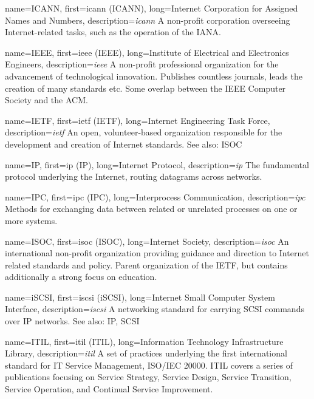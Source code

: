 {
	name={ICANN},
	first={\acrlong{icann} (ICANN)},
	long={Internet Corporation for Assigned Names and Numbers},
	description={{\em \acrlong{icann}} A
non-profit corporation overseeing Internet-related tasks, such as the
operation of the IANA.}
}

{
	name={IEEE},
	first={\acrlong{ieee} (IEEE)},
	long={Institute of Electrical and Electronics Engineers},
	description={{\em \acrlong{ieee}} A
non-profit professional organization for the advancement of technological
innovation.  Publishes countless journals, leads the creation of many
standards etc.  Some overlap between the IEEE Computer Society and the
ACM.}
}

{
	name={IETF},
	first={\acrlong{ietf} (IETF)},
	long={Internet Engineering Task Force},
	description={{\em \acrlong{ietf}} An open, volunteer-based
organization responsible for the development and creation of Internet
standards.  See also: ISOC}
}

{
	name={IP},
	first={\acrlong{ip} (IP)},
	long={Internet Protocol},
	description={{\em \acrlong{ip}} The fundamental protocol underlying the
Internet, routing datagrams across networks.}
}

{
	name={IPC},
	first={\acrlong{ipc} (IPC)},
	long={Interprocess Communication},
	description={{\em \acrlong{ipc}} Methods for exchanging data
between related or unrelated processes on one or more
systems.}
}

{
	name={ISOC},
	first={\acrlong{isoc} (ISOC)},
	long={Internet Society},
	description={{\em \acrlong{isoc}} An international non-profit
organization providing guidance and direction to Internet related
standards and policy.  Parent organization of the IETF, but contains
additionally a strong focus on education.}
}

{
	name={iSCSI},
	first={\acrlong{iscsi} (iSCSI)},
	long={Internet Small Computer System Interface},
	description={{\em \acrlong{iscsi}} A networking
standard for carrying SCSI commands over IP networks.
See also: IP, SCSI}
}

{
	name={ITIL},
	first={\acrlong{itil} (ITIL)},
	long={Information Technology Infrastructure Library},
	description={{\em \acrlong{itil}} A set of
practices underlying the first international standard for IT Service
Management, ISO/IEC 20000.  ITIL covers a series of publications focusing
on Service Strategy, Service Design, Service Transition, Service
Operation, and Continual Service Improvement.}
}

